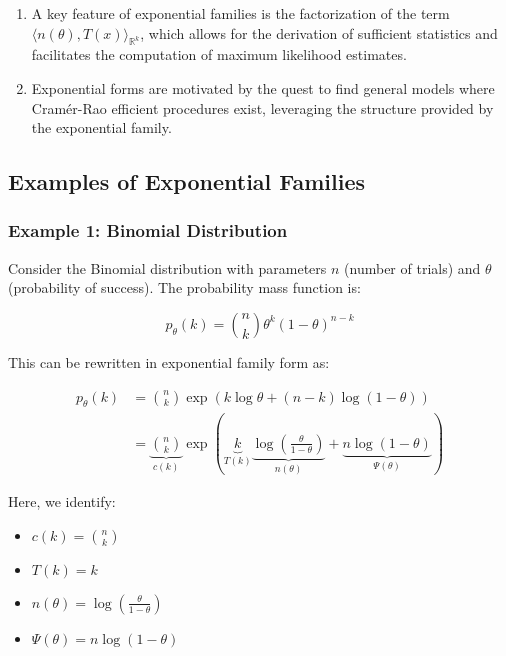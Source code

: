 \documentclass[open=any, 11pt,paper=A4]{scrreprt}
\begin{document}
\begin{remark}
    \begin{enumerate}
        \item A key feature of exponential families is the factorization of the term \(\langle n(\theta), T(x) \rangle_{\mathbb{R}^k}\), which allows for the derivation of sufficient statistics and facilitates the computation of maximum likelihood estimates.
        \item Exponential forms are motivated by the quest to find general models where Cramér-Rao efficient procedures exist, leveraging the structure provided by the exponential family.
    \end{enumerate}
\end{remark}

\subsection*{Examples of Exponential Families}

\subsubsection*{Example 1: Binomial Distribution}

Consider the Binomial distribution with parameters \(n\) (number of trials) and \(\theta\) (probability of success). The probability mass function is:

\[
p_\theta(k) = \binom{n}{k} \theta^k (1 - \theta)^{n - k}
\]

This can be rewritten in exponential family form as:

\begin{align*}
p_\theta(k) &= \binom{n}{k} \exp\left( k \log \theta + (n - k) \log(1 - \theta) \right) \\
&= \underbrace{\binom{n}{k}}_{c(k)} \exp\left( \underbrace{k}_{T(k)} \underbrace{\log \left( \frac{\theta}{1 - \theta} \right)}_{n(\theta)} + \underbrace{n \log(1 - \theta)}_{\Psi(\theta)} \right)
\end{align*}

Here, we identify:
\begin{itemize}
    \item \(c(k) = \binom{n}{k}\)
    \item \(T(k) = k\)
    \item \(n(\theta) = \log \left( \frac{\theta}{1 - \theta} \right)\)
    \item \(\Psi(\theta) = n \log(1 - \theta)\)
\end{itemize}
\end{document}
